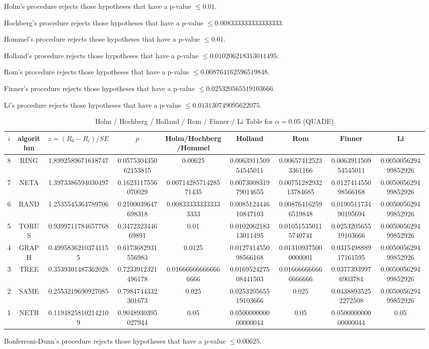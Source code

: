 \documentclass[a4paper,10pt]{article}
\begin{document}
\begin{landscape}
Holm's procedure rejects those hypotheses that have a p-value $\le0.01$.


Hochberg's procedure rejects those hypotheses that have a p-value $\le0.008333333333333333$.


Hommel's procedure rejects those hypotheses that have a p-value $\le0.01$.


Holland's procedure rejects those hypotheses that have a p-value $\le0.010206218313011495$.


Rom's procedure rejects those hypotheses that have a p-value $\le0.008764162596519848$.


Finner's procedure rejects those hypotheses that have a p-value $\le0.025320565519103666$.


Li's procedure rejects those hypotheses that have a p-value $\le0.013130749095622075$.



\newpage

\begin{table}[!htp]
\centering\scriptsize
\caption{Holm / Hochberg / Holland / Rom / Finner / Li Table for $\alpha=0.05$ (QUADE)}
\begin{tabular}{ccccccccc}
$i$&algorithm&$z=(R_0 - R_i)/SE$&$p$&Holm/Hochberg/Hommel&Holland&Rom&Finner&Li\\
\hline
8& RING&1.8992589671618747&0.057530435062153815&0.00625&0.006391150954545011&0.006574125233361166&0.006391150954545011&0.005005629499852926\\
7& NETA&1.3973386594030497&0.1623117556070029&0.0071428571428571435&0.007300831979014655&0.0075128293213784685&0.012741455098566168&0.005005629499852926\\
6& RAND&1.2535545364789706&0.2100039647698318&0.008333333333333333&0.008512444610847103&0.008764162596519848&0.019051173490195694&0.005005629499852926\\
5& TORUS&0.9399711784657768&0.347232344669891&0.01&0.010206218313011495&0.010515350115740741&0.025320565519103666&0.005005629499852926\\
4& GRAPH&0.49958362103741155&0.6173682931556983&0.0125&0.012741455098566168&0.013109375000000001&0.031549888917161595&0.005005629499852926\\
3& TREE&0.3539301487362028&0.7233912321496178&0.016666666666666666&0.016952427508441503&0.016666666666666666&0.03773939976903784&0.005005629499852926\\
2& SAME&0.2553219690927085&0.7984744332301673&0.025&0.025320565519103666&0.025&0.04388935252272508&0.005005629499852926\\
1& NETB&0.11948258102142109&0.9048930395027944&0.05&0.050000000000000044&0.05&0.050000000000000044&0.05\\
\hline
\end{tabular}
\end{table}
Bonferroni-Dunn's procedure rejects those hypotheses that have a p-value $\le0.00625$.



\end{landscape}
\end{document}
